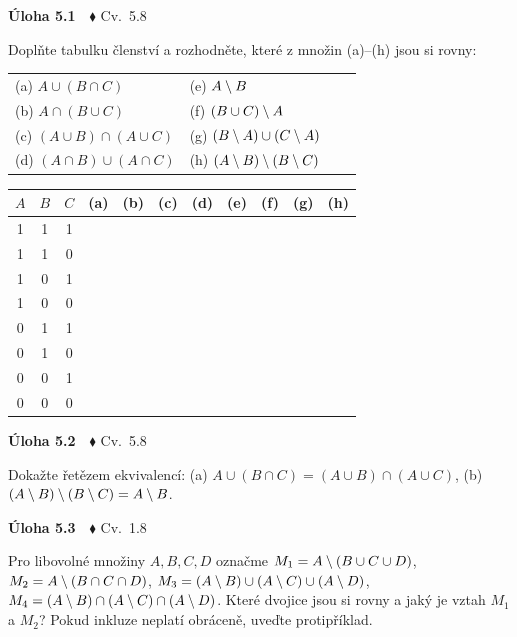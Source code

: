 \documentclass[11pt,a4paper]{article}
\newenvironment{uloha}[2]{\Needspace{6\baselineskip}\par\vspace{6pt}\noindent\textbf{Úloha #1}\ \ {\footnotesize\color{gray}#2}\par\vspace{2pt}}{\par\vspace{4pt}}
\begin{document}
\begin{uloha}{5.1}{$\blacklozenge$ Cv.~5.8}
Doplňte tabulku členství a rozhodněte, které z množin (a)--(h) jsou si rovny:
\begin{center}\small
\begin{tabular}{@{}ll@{\qquad}ll@{}}
(a) $A\cup(B\cap C)$ & (e) $A\setminus B$ \\
(b) $A\cap(B\cup C)$ & (f) $(B\cup C)\setminus A$ \\
(c) $(A\cup B)\cap(A\cup C)$ & (g) $(B\setminus A)\cup(C\setminus A)$ \\
(d) $(A\cap B)\cup(A\cap C)$ & (h) $(A\setminus B)\setminus(B\setminus C)$ \\
\end{tabular}
\end{center}
\begin{center}
\renewcommand{\arraystretch}{1.55}
\begin{tabular}{|c|c|c|*{8}{c|}}
\hline
$A$&$B$&$C$&(a)&(b)&(c)&(d)&(e)&(f)&(g)&(h)\\\hline
1&1&1&\hspace{0.65cm}&\hspace{0.65cm}&\hspace{0.65cm}&\hspace{0.65cm}&\hspace{0.65cm}&\hspace{0.65cm}&\hspace{0.65cm}&\hspace{0.65cm}\\\hline
1&1&0&&&&&&&&\\\hline
1&0&1&&&&&&&&\\\hline
1&0&0&&&&&&&&\\\hline
0&1&1&&&&&&&&\\\hline
0&1&0&&&&&&&&\\\hline
0&0&1&&&&&&&&\\\hline
0&0&0&&&&&&&&\\\hline
\end{tabular}
\end{center}
\end{uloha}

\begin{uloha}{5.2}{$\blacklozenge$ Cv.~5.8}
Dokažte řetězem ekvivalencí: (a) $A\cup(B\cap C)=(A\cup B)\cap(A\cup C)$, (b) $(A\setminus B)\setminus(B\setminus C)=A\setminus B$.


\end{uloha}

\begin{uloha}{5.3}{$\blacklozenge$ Cv.~1.8}
Pro libovolné množiny $A,B,C,D$ označme $M_1=A\setminus(B\cup C\cup D)$, $M_2=A\setminus(B\cap C\cap D)$, $M_3=(A\setminus B)\cup(A\setminus C)\cup(A\setminus D)$, $M_4=(A\setminus B)\cap(A\setminus C)\cap(A\setminus D)$. Které dvojice jsou si rovny a jaký je vztah $M_1$ a $M_2$? Pokud inkluze neplatí obráceně, uveďte protipříklad.

\end{uloha}
\end{document}
